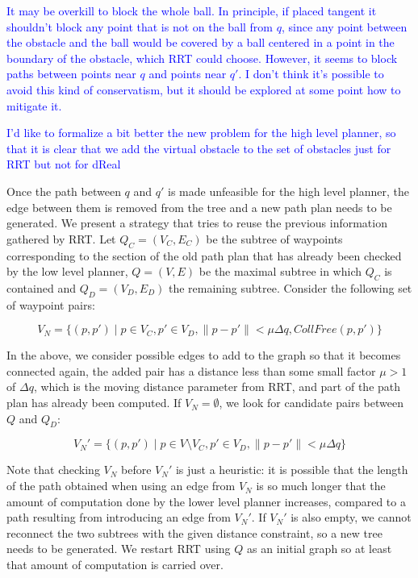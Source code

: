 \documentclass[12pt]{article}
\newcommand\fran[1]{\textcolor{blue}{#1}}
\begin{document}
\fran{It may be overkill to block the whole ball. In principle, if placed tangent it shouldn't block any point that is not on the ball from $q$, since any point between the obstacle and the ball would be covered by a ball centered in a point in the boundary of the obstacle, which RRT could choose. However, it seems to block paths between points near $q$ and points near $q'$. I don't think it's possible to avoid this kind of conservatism, but it should be explored at some point how to mitigate it.}

\fran{I'd like to formalize a bit better the new problem for the high level planner, so that it is clear that we add the virtual obstacle to the set of obstacles just for RRT but not for dReal}

Once the path between $q$ and $q'$ is made unfeasible for the high level planner, the edge between them is removed from the tree and a new path plan needs to be generated. We present a strategy that tries to reuse the previous information gathered by RRT. Let $Q_C = (V_C, E_C)$ be the subtree of waypoints corresponding to the section of the old path plan that has already been checked by the low level planner, $Q = (V, E)$ be the maximal subtree in which $Q_C$ is contained and $Q_D = (V_D, E_D)$ the remaining subtree. Consider the following set of waypoint pairs:

\begin{equation}
    \label{eq:checked_candidates}
    V_N = \{(p, p') \mid p \in V_C, p' \in V_D, \|p - p'\| < \mu \Delta q, CollFree(p, p')\}
\end{equation}

In the above, we consider possible edges to add to the graph so that it becomes connected again, the added pair has a distance less than some small factor $\mu > 1$ of $\Delta q$, which is the moving distance parameter from RRT, and part of the path plan has already been computed. If $V_N = \emptyset$, we look for candidate pairs between $Q$ and $Q_D$:

\begin{equation}
    \label{eq:unchecked_candidates}
    V_N' = \{(p, p') \mid p \in V \setminus V_C, p' \in V_D, \|p - p'\| < \mu \Delta q\}
\end{equation}

Note that checking $V_N$ before $V_N'$ is just a heuristic: it is possible that the length of the path obtained when using an edge from $V_N$ is so much longer that the amount of computation done by the lower level planner increases, compared to a path resulting from introducing an edge from $V_N'$. If $V_N'$ is also empty, we cannot reconnect the two subtrees with the given distance constraint, so a new tree needs to be generated. We restart RRT using $Q$ as an initial graph so at least that amount of computation is carried over.
\end{document}
